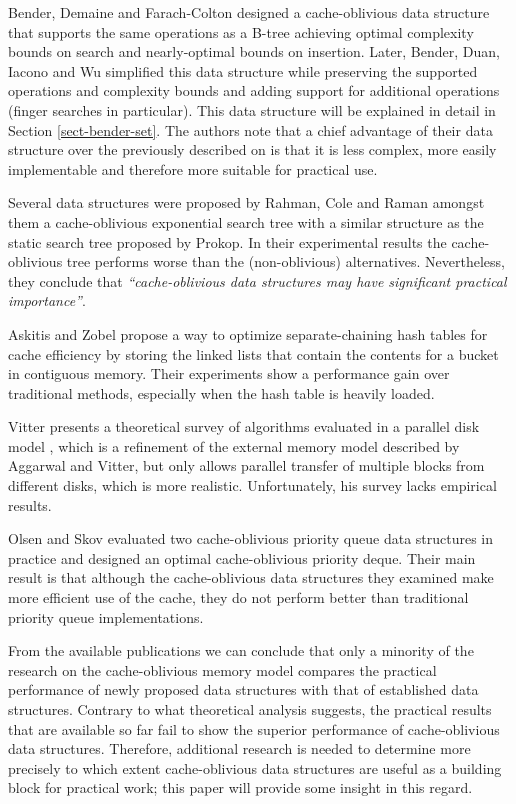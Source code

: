 \documentclass{acm_proc_article-sp}
\begin{document}
Bender, Demaine and Farach-Colton designed a cache-oblivious data structure that supports the same operations as a B-tree \cite{bender2005cob} achieving optimal complexity bounds on search and nearly-optimal bounds on insertion.
Later, Bender, Duan, Iacono and Wu simplified this data structure \cite{bender2004lpc} while preserving the supported operations and complexity bounds and adding support for additional operations (finger searches in particular).
This data structure will be explained in detail in Section \ref{sect-bender-set}.
The authors note that a chief advantage of their data structure over the previously described on is that it is less complex, more easily implementable and therefore more suitable for practical use.

Several data structures were proposed by Rahman, Cole and Raman \cite{rahman2001opd} amongst them a cache-oblivious exponential search tree with a similar structure as the static search tree proposed by Prokop. In their experimental results the cache-oblivious tree performs worse than the (non-oblivious) alternatives. Nevertheless, they conclude that \textit{``cache-obli\-vious data structures may have significant practical importance''}.

Askitis and Zobel \cite{askitis2005ccc} propose a way to optimize separate-chaining hash tables for cache efficiency by storing the linked lists that contain the contents for a bucket in contiguous memory. Their experiments show a performance gain over traditional methods, especially when the hash table is heavily loaded.

Vitter presents a theoretical survey of algorithms evaluated in a parallel disk model \cite{vitter2001ema}, which is a refinement of the external memory model described by Aggarwal and Vitter, but only allows parallel transfer of multiple blocks from different disks, which is more realistic. Unfortunately, his survey lacks empirical results.

Olsen and Skov evaluated two cache-oblivious priority queue data structures in practice \cite{olsen2002coa} and designed an optimal cache-obli\-vious priority deque. Their main result is that although the cache-obli\-vious data structures they examined make more efficient use of the cache, they do not perform better than traditional priority queue implementations.

From the available publications we can conclude that only a minority of the research on the cache-oblivious memory model compares the practical performance of newly proposed data structures with that of established data structures.
Contrary to what theoretical analysis suggests, the practical results that are available so far fail to show the superior performance of cache-oblivious data structures.
Therefore, additional research is needed to determine more precisely to which extent cache-oblivious data structures are useful as a building block for practical work; this paper will provide some insight in this regard.
\end{document}
